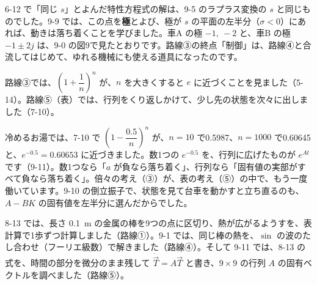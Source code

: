 \begin{bkfigure}
\end{bkfigure}

6-12 で「同じ $s$」とよんだ特性方程式の解は、9-5 のラプラス変換の $s$ と同じものでした。9-9 では、この点を\textbf{極}とよび、極が $s$ の平面の左半分（$\sigma<0$）にあれば、動きは落ち着くことを学びました。車A の極 $-1,\ -2$ と、車B の極 $-1\pm2j$ は、9-0 の図9で見たとおりです。路線③の終点「制御」は、路線④と合流してはじめて、ゆれる機械にも使える道具になったのです。


\label{bk:9-13:eat}路線③では、$\left(1+\dfrac{1}{n}\right)^n$ が、$n$ を大きくすると $e$ に近づくことを見ました（5-14）。路線⑤（表）では、行列をくり返しかけて、少し先の状態を次々に出しました（7-10）。

\begin{bkfigure}
\end{bkfigure}

冷めるお湯では、7-10 で $\left(1-\dfrac{0.5}{n}\right)^n$ が、$n=10$ で0.5987、$n=1000$ で0.60645 と、$e^{-0.5}=0.60653$ に近づきました。数1つの $e^{-0.5}$ を、行列に広げたものが $e^{At}$ です（9-11）。数1つなら「$a$ が負なら落ち着く」、行列なら「固有値の実部がすべて負なら落ち着く」。倍々の考え（③）が、表の考え（⑤）の中で、もう一度働いています。9-10 の倒立振子で、状態を見て台車を動かすと立ち直るのも、$A-BK$ の固有値を左半分に選んだからでした。


\label{bk:9-13:sin}8-13 では、長さ \qty{0.1}{m} の金属の棒を9つの点に区切り、熱が広がるようすを、表計算で1歩ずつ計算しました（路線①）。9-1 では、同じ棒の熱を、$\sin$ の波のたし合わせ（フーリエ級数）で解きました（路線④）。そして 9-11 では、8-13 の式を、時間の部分を微分のまま残して $\dot{\vec T}=A\vec T$ と書き、$9\times9$ の行列 $A$ の固有ベクトルを調べました（路線⑤）。


